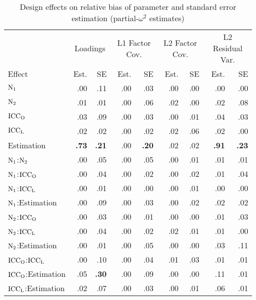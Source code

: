 \documentclass[man, noextraspace, 12pt]{apa7}
\begin{document}
\begin{table}[h]
 \centering
 \begin{threeparttable}
 \caption{Design effects on relative bias of parameter and standard error estimation (partial-$\omega^2$ estimates)}
 \label{tb:anova-pomega}
 \begin{tabular}{l *{8}{r}} %
   \toprule
   & \multicolumn{2}{c}{Loadings} & \multicolumn{2}{c}{L1 Factor Cov.} & \multicolumn{2}{c}{L2 Factor Cov.} & \multicolumn{2}{c}{L2 Residual Var.}\\ 
   \cmidrule(lr){2-3} \cmidrule(lr){4-5} \cmidrule(lr){6-7} \cmidrule(lr){8-9}
   Effect & Est. & SE & Est. & SE & Est. & SE & Est. & SE\\
   \midrule
  $\rm N_1$           				& .00 & .11 & .00 & .03 & .00 & .00 & .00 &  .00 \\
  $\rm N_2$            				& .01 & .01 & .00 & .06 & .02 & .00 & .02 &  .08 \\
  $\rm ICC_O$  				& .03 & .09 & .00 & .03 & .00 & .01 & .04 &  .03 \\ 
  $\rm ICC_L$  				& .02 & .02 & .00 & .02 & .02 & .06 & .02 &  .00 \\ 
  Estimation       					& {\bf .73} & {\bf .21} & .00 & {\bf .20} & .02 & .02 & {\bf .91} &  {\bf .23} \\
  $\rm N_1$:$\rm N_2$      			& .00 & .05 & .00 & .05 & .00 & .01 & .01 &  .01 \\ 
  $\rm N_1$:$\rm ICC_O$      	& .00 & .04 & .00 & .02 & .00 & .02 & .01 &  .04 \\  
  $\rm N_1$:$\rm ICC_L$   		& .00 & .01 & .00 & .00 & .00 & .01 & .00 &  .00 \\
  $\rm N_1$:Estimation 				& .00 & .09 & .00 & .03 & .00 & .02 & .02 &  .02 \\ 
  $\rm N_2$:$\rm ICC_O$     	& .00 & .03 & .00 & .01 & .00 & .00 & .01 &  .03 \\
  $\rm N_2$:$\rm ICC_L$     	& .00 & .04 & .00 & .02 & .02 & .01 & .01 &  .00 \\ 
  $\rm N_2$:Estimation  			& .00 & .01 & .00 & .05 & .00 & .00 & .03 &  .11 \\ 
  $\rm ICC_O$:$\rm ICC_L$ & .00 & .10 & .00 & .04 & .01 & .03 & .01 &  .01 \\ 
  $\rm ICC_O$:Estimation 		& .05 & {\bf .30} & .00 & .09 & .00 & .00 & .11 &  .01 \\ 
  $\rm ICC_L$:Estimation 		& .02 & .07 & .00 & .03 & .00 & .01 & .06 &  .01 \\

\end{tabular}
\end{threeparttable}
\end{table}
\end{document}
